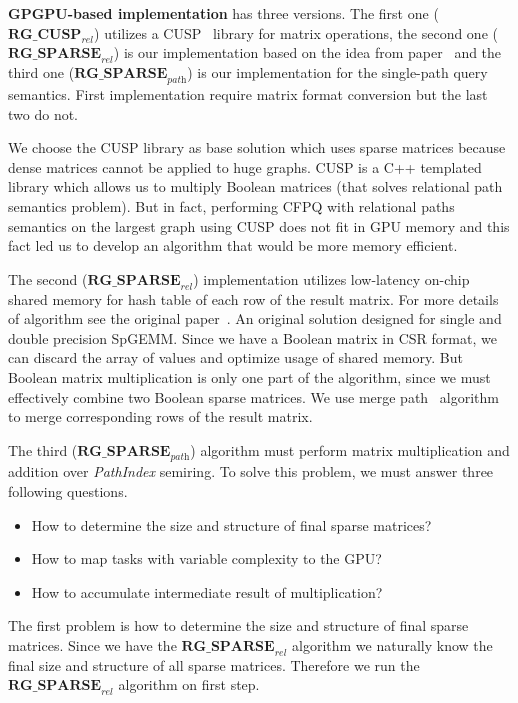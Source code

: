 \textbf{GPGPU-based implementation} has three versions.
The first one ($\textbf{RG\_CUSP}_{\textit{rel}}$) utilizes a CUSP~\cite{Cusp} library for matrix operations, the second one ($\textbf{RG\_SPARSE}_{\textit{rel}}$) is our implementation based on the idea from paper~\cite{NsparsePaper} and the third one ($\textbf{RG\_SPARSE}_{\textit{path}}$) is our implementation for the single-path query semantics.
First implementation require matrix format conversion but the last two do not.

We choose the CUSP library as base solution which uses sparse matrices because dense matrices cannot be applied to huge graphs. CUSP is a C++ templated library which allows us to multiply Boolean matrices (that solves relational path semantics problem). But in fact, performing CFPQ with relational paths semantics on the largest graph using CUSP does not fit in GPU memory and this fact led us to develop an algorithm that would be more memory efficient.

The second ($\textbf{RG\_SPARSE}_{\textit{rel}}$) implementation utilizes low-latency on-chip shared memory for hash table of each row of the result matrix. For more details of algorithm see the original paper~\cite{NsparsePaper}. An original solution designed for single and double precision SpGEMM. Since we have a Boolean matrix in CSR format, we can discard the array of values and optimize usage of shared memory. But Boolean matrix multiplication is only one part of the algorithm, since we must effectively combine two Boolean sparse matrices. We use merge path~\cite{GpuMergePathPaper} algorithm to merge corresponding rows of the result matrix.

The third ($\textbf{RG\_SPARSE}_{\textit{path}}$) algorithm must perform matrix multiplication and addition over \textit{PathIndex} semiring. To solve this problem, we must answer three following questions. 

\begin{itemize}
  \item How to determine the size and structure of final sparse matrices?
  \item How to map tasks with variable complexity to the GPU?
  \item How to accumulate intermediate result of multiplication?
\end{itemize}

The first problem is how to determine the size and structure of final sparse matrices. Since we have the $\textbf{RG\_SPARSE}_{\textit{rel}}$ algorithm we naturally know the final size and structure of all sparse matrices. Therefore we run the $\textbf{RG\_SPARSE}_{\textit{rel}}$ algorithm on first step.


